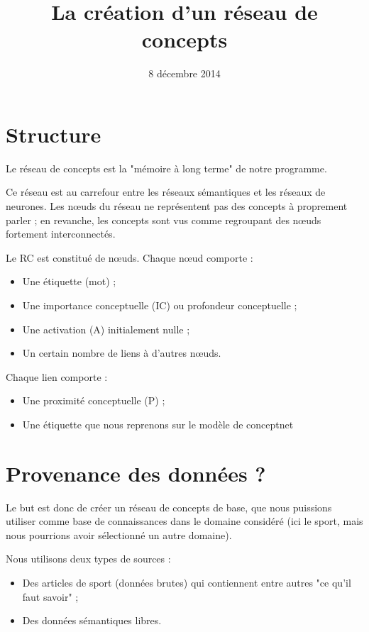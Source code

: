 \documentclass[a4paper,12pt]{article}
\title{La création d'un réseau de concepts}
\author{\membres} %
\date{8 décembre 2014}
\begin{document}
\titrecourt %

\section{Structure}


\begin{definition}
Le réseau de concepts est la "mémoire à long terme" de notre programme.

Ce réseau est au carrefour entre les réseaux sémantiques et les réseaux de neurones. Les n\oe uds du réseau ne représentent pas des concepts à proprement parler ; en revanche, les concepts sont vus comme regroupant des n\oe uds fortement interconnectés.
\end{definition}

Le RC est constitué de n\oe uds. Chaque n\oe ud comporte :
\begin{itemize}
  \item Une étiquette (mot) ;
 \item Une importance conceptuelle (IC) ou profondeur conceptuelle ;
 \item Une activation (A) initialement nulle ;
 \item Un certain nombre de liens à d'autres n\oe uds.
\end{itemize}

Chaque lien comporte :
\begin{itemize}
 \item Une proximité conceptuelle (P) ;
 \item Une étiquette que nous reprenons sur le modèle de conceptnet
\end{itemize}


\section{Provenance des données ?}

Le but est donc de créer un réseau de concepts de base, que nous puissions utiliser comme base de connaissances dans le domaine considéré (ici le sport, mais nous pourrions avoir sélectionné un autre domaine).

Nous utilisons deux types de sources :
\begin{itemize}
 \item Des articles de sport (données brutes) qui contiennent entre autres "ce qu'il faut savoir" ;
 \item Des données sémantiques libres.
\end{itemize}
\end{document}

